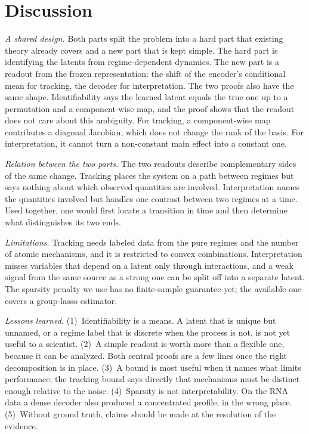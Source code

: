 \documentclass[10pt,twocolumn,letterpaper]{article}
\newcommand{\para}[1]{\textit{#1.}}
\theoremstyle{definition}
\begin{document}
\section{Discussion}
\label{sec:discussion}

\para{A shared design}
Both parts split the problem into a hard part that existing theory already covers and a new part that is kept simple.
The hard part is identifying the latents from regime-dependent dynamics.
The new part is a readout from the frozen representation: the shift of the encoder's conditional mean for tracking, the decoder for interpretation.
The two proofs also have the same shape.
Identifiability says the learned latent equals the true one up to a permutation and a component-wise map, and the proof shows that the readout does not care about this ambiguity.
For tracking, a component-wise map contributes a diagonal Jacobian, which does not change the rank of the basis.
For interpretation, it cannot turn a non-constant main effect into a constant one.

\para{Relation between the two parts}
The two readouts describe complementary sides of the same change.
Tracking places the system on a path between regimes but says nothing about which observed quantities are involved.
Interpretation names the quantities involved but handles one contrast between two regimes at a time.
Used together, one would first locate a transition in time and then determine what distinguishes its two ends.

\para{Limitations}
Tracking needs labeled data from the pure regimes and the number of atomic mechanisms, and it is restricted to convex combinations.
Interpretation misses variables that depend on a latent only through interactions, and a weak signal from the same source as a strong one can be split off into a separate latent.
The sparsity penalty we use has no finite-sample guarantee yet; the available one covers a group-lasso estimator.

\para{Lessons learned}
(1)~Identifiability is a means.
A latent that is unique but unnamed, or a regime label that is discrete when the process is not, is not yet useful to a scientist.
(2)~A simple readout is worth more than a flexible one, because it can be analyzed.
Both central proofs are a few lines once the right decomposition is in place.
(3)~A bound is most useful when it names what limits performance; the tracking bound says directly that mechanisms must be distinct enough relative to the noise.
(4)~Sparsity is not interpretability.
On the RNA data a dense decoder also produced a concentrated profile, in the wrong place.
(5)~Without ground truth, claims should be made at the resolution of the evidence.
\end{document}
